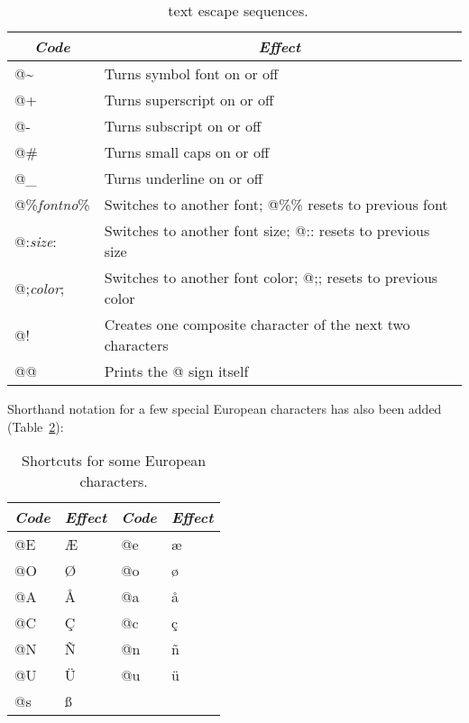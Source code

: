 \begin{table}[H]
\centering
\begin{tabular}{|l|l|} \hline
\multicolumn{1}{|c|}{\emph{Code}}	&	\multicolumn{1}{c|}{\emph{Effect}} \\ \hline
@\~	&	Turns symbol font on or off \\ \hline 
@+	&	Turns superscript on or off \\ \hline 
@-	&	Turns subscript on or off \\ \hline 
@\#	&	Turns small caps on or off \\ \hline 
@\_	&	Turns underline on or off \\ \hline 
@\%\emph{fontno}\%	&	Switches to another font; @\%\% resets to previous font \\ \hline 
@:\emph{size}:	&	Switches to another font size; @:: resets to previous size \\ \hline 
@;\emph{color};	&	Switches to another font color; @;; resets to previous color \\ \hline 
@!	&	Creates one composite character of the next two characters \\ \hline 
@@	&	Prints the @ sign itself \\ \hline 
\end{tabular}
\caption{\gmt\ text escape sequences.}
\label{tbl:escape}
\end{table}

Shorthand notation for a few special European characters has also been
added (Table~\ref{tbl:scand}):

\begin{table}[H]
\centering
\begin{tabular}{|l|l||l|l|} \hline
\emph{Code} & \emph{Effect}  & \emph{Code} & \emph{Effect} \\ \hline
@E &  \AE   & @e &  \ae   \\ \hline
@O &  \O    & @o &  \o    \\ \hline
@A &  \AA   & @a &  \aa   \\ \hline
@C &  \c{C} & @c &  \c{c} \\ \hline
@N &  \~{N} & @n &  \~{n} \\ \hline
@U &  \"{U} & @u &  \"{u} \\ \hline
@s &  \ss   &    &        \\ \hline
\end{tabular}
\caption{Shortcuts for some European characters.}
\label{tbl:scand}
\end{table}

